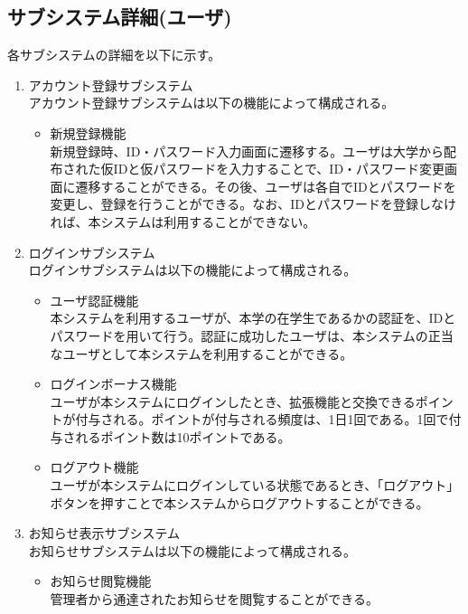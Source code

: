 \documentclass[a4j]{jarticle}
\begin{document}
\subsection{サブシステム詳細(ユーザ)}
各サブシステムの詳細を以下に示す。
\begin{enumerate}
  \item アカウント登録サブシステム\\
  アカウント登録サブシステムは以下の機能によって構成される。
  \begin{itemize}
    \item 新規登録機能\\
    新規登録時、ID・パスワード入力画面に遷移する。ユーザは大学から配布された仮IDと仮パスワードを入力することで、ID・パスワード変更画面に遷移することができる。その後、ユーザは各自でIDとパスワードを変更し、登録を行うことができる。なお、IDとパスワードを登録しなければ、本システムは利用することができない。
  \end{itemize}

  \item ログインサブシステム\\
  ログインサブシステムは以下の機能によって構成される。
  \begin{itemize}
    \item ユーザ認証機能\\
    本システムを利用するユーザが、本学の在学生であるかの認証を、IDとパスワードを用いて行う。認証に成功したユーザは、本システムの正当なユーザとして本システムを利用することができる。
    \item ログインボーナス機能\\
    ユーザが本システムにログインしたとき、拡張機能と交換できるポイントが付与される。ポイントが付与される頻度は、1日1回である。1回で付与されるポイント数は10ポイントである。
    \item ログアウト機能\\
    ユーザが本システムにログインしている状態であるとき、「ログアウト」ボタンを押すことで本システムからログアウトすることができる。
  \end{itemize}

  \item お知らせ表示サブシステム\\
  お知らせサブシステムは以下の機能によって構成される。
  \begin{itemize}
    \item お知らせ閲覧機能\\
    管理者から通達されたお知らせを閲覧することができる。
  \end{itemize}


\end{enumerate}
\end{document}
